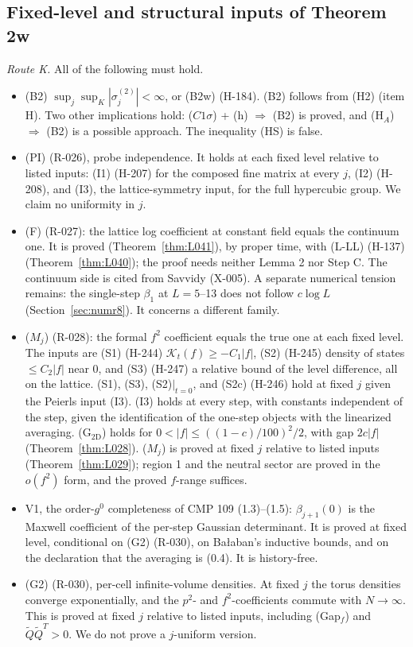 \subsection{Fixed-level and structural inputs of Theorem 2w}\label{sec:rem-inputs}

\emph{Route K.} All of the following must hold.
\begin{itemize}
\item[1.] (B2) $\sup_j\sup_K|\sigma_j^{(2)}|<\infty$, or (B2w) (H-184). (B2) follows from (H2) (item H). Two other implications hold: ($C1\sigma$) + (h) $\Rightarrow$ (B2) is proved, and (H$_A$) $\Rightarrow$ (B2) is a possible approach. The inequality (HS) is false.
\item[2.] (PI) (R-026), probe independence. It holds at each fixed level relative to listed inputs: (I1) (H-207) for the composed fine matrix at every $j$, (I2) (H-208), and (I3), the lattice-symmetry input, for the full hypercubic group. We claim no uniformity in $j$.
\item[3.] (F) (R-027): the lattice log coefficient at constant field equals the continuum one. It is proved (Theorem~\ref{thm:L041}), by proper time, with (L-LL) (H-137) (Theorem~\ref{thm:L040}); the proof needs neither Lemma 2 nor Step C. The continuum side is cited from Savvidy \cite{savvidy1977} (X-005). A separate numerical tension remains: the single-step $\beta_1$ at $L=5$--13 does not follow $c\log L$ (Section~\ref{sec:numr8}). It concerns a different family.
\item[4.] ($M_j$) (R-028): the formal $f^2$ coefficient equals the true one at each fixed level. The inputs are (S1) (H-244) $\mathcal K_t(f)\ge-C_1|f|$, (S2) (H-245) density of states $\le C_2|f|$ near 0, and (S3) (H-247) a relative bound of the level difference, all on the lattice. (S1), (S3), (S2)$|_{t=0}$, and (S2c) (H-246) hold at fixed $j$ given the Peierls input (I3). (I3) holds at every step, with constants independent of the step, given the identification of the one-step objects with the linearized averaging. (G$_{\mathrm{2D}}$) holds for $0<|f|\le((1-c)/100)^2/2$, with gap $2c|f|$ (Theorem~\ref{thm:L028}). ($M_j$) is proved at fixed $j$ relative to listed inputs (Theorem~\ref{thm:L029}); region 1 and the neutral sector are proved in the $o(f^2)$ form, and the proved $f$-range suffices.
\item[5.] V1, the order-$g^0$ completeness of CMP 109 (1.3)--(1.5): $\beta_{j+1}(0)$ is the Maxwell coefficient of the per-step Gaussian determinant. It is proved at fixed level, conditional on (G2) (R-030), on Ba{\l}aban's inductive bounds, and on the declaration that the averaging is (0.4). It is history-free.
\item[6.] (G2) (R-030), per-cell infinite-volume densities. At fixed $j$ the torus densities converge exponentially, and the $p^2$- and $f^2$-coefficients commute with $N\to\infty$. This is proved at fixed $j$ relative to listed inputs, including (Gap$_f$) and $\tilde Q\tilde Q^T>0$. We do not prove a $j$-uniform version.
\end{itemize}


